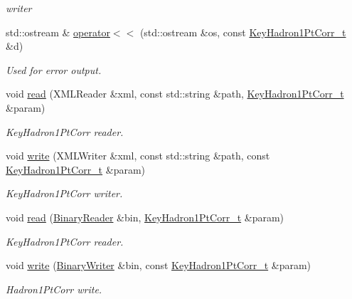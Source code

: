 \begin{DoxyCompactItemize}
\begin{DoxyCompactList}\small\item\em writer \end{DoxyCompactList}\item 
std\+::ostream \& \mbox{\hyperlink{namespaceFF_aa86be255f897379f638160fcf2504397}{operator$<$$<$}} (std\+::ostream \&os, const \mbox{\hyperlink{structFF_1_1KeyHadron1PtCorr__t}{Key\+Hadron1\+Pt\+Corr\+\_\+t}} \&d)
\begin{DoxyCompactList}\small\item\em Used for error output. \end{DoxyCompactList}\item 
void \mbox{\hyperlink{namespaceFF_acb4db5dbe27937736b4f2cbed9694c56}{read}} (X\+M\+L\+Reader \&xml, const std\+::string \&path, \mbox{\hyperlink{structFF_1_1KeyHadron1PtCorr__t}{Key\+Hadron1\+Pt\+Corr\+\_\+t}} \&param)
\begin{DoxyCompactList}\small\item\em Key\+Hadron1\+Pt\+Corr reader. \end{DoxyCompactList}\item 
void \mbox{\hyperlink{namespaceFF_ab36d46cd7c78477e7dcc2679d6cadd26}{write}} (X\+M\+L\+Writer \&xml, const std\+::string \&path, const \mbox{\hyperlink{structFF_1_1KeyHadron1PtCorr__t}{Key\+Hadron1\+Pt\+Corr\+\_\+t}} \&param)
\begin{DoxyCompactList}\small\item\em Key\+Hadron1\+Pt\+Corr writer. \end{DoxyCompactList}\item 
void \mbox{\hyperlink{namespaceFF_a09293bf4dc7954334e338c256b1efc75}{read}} (\mbox{\hyperlink{classADATIO_1_1BinaryReader}{Binary\+Reader}} \&bin, \mbox{\hyperlink{structFF_1_1KeyHadron1PtCorr__t}{Key\+Hadron1\+Pt\+Corr\+\_\+t}} \&param)
\begin{DoxyCompactList}\small\item\em Key\+Hadron1\+Pt\+Corr reader. \end{DoxyCompactList}\item 
void \mbox{\hyperlink{namespaceFF_a78fdf587c961ada1987ee8f443e3d961}{write}} (\mbox{\hyperlink{classADATIO_1_1BinaryWriter}{Binary\+Writer}} \&bin, const \mbox{\hyperlink{structFF_1_1KeyHadron1PtCorr__t}{Key\+Hadron1\+Pt\+Corr\+\_\+t}} \&param)
\begin{DoxyCompactList}\small\item\em Hadron1\+Pt\+Corr write. \end{DoxyCompactList}\item 

\end{DoxyCompactItemize}
